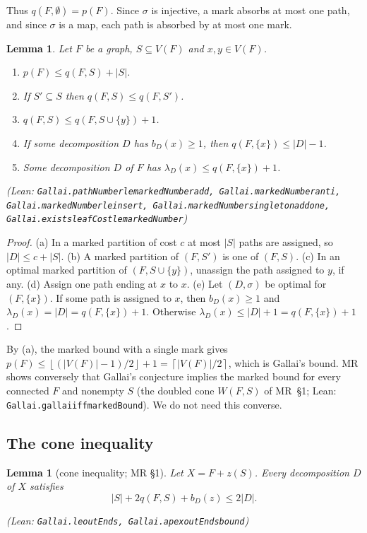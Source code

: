 \documentclass[11pt]{amsart}
\newtheorem{lemma}[theorem]{Lemma}
\theoremstyle{definition}
\theoremstyle{remark}
\renewcommand{\_}{\oldunderscore\allowbreak}
\newcommand{\leanst}[1]{\par{\raggedright\small\textup{(Lean: \texttt{#1})}\par}}
\newcommand{\fl}[1]{\left\lfloor #1\right\rfloor}
\newcommand{\cl}[1]{\left\lceil #1\right\rceil}
\begin{document}
Thus $q(F,\emptyset)=p(F)$. Since $\sigma$ is injective, a mark absorbs at most one path, and since
$\sigma$ is a map, each path is absorbed by at most one mark.

\begin{lemma}\label{lem:marked-basic}
Let $F$ be a graph, $S\subseteq V(F)$ and $x,y\in V(F)$.
\begin{enumerate}[label=\textup{(\alph*)}]
\item $p(F)\le q(F,S)+|S|$.
\item If $S'\subseteq S$ then $q(F,S)\le q(F,S')$.
\item $q(F,S)\le q(F,S\cup\{y\})+1$.
\item If some decomposition $D$ has $b_D(x)\ge1$, then $q(F,\{x\})\le|D|-1$.
\item Some decomposition $D$ of $F$ has $\lambda_D(x)\le q(F,\{x\})+1$.
\end{enumerate}
\leanst{Gallai.pathNumber\_le\_markedNumber\_add, Gallai.markedNumber\_anti,
Gallai.markedNumber\_le\_insert, Gallai.markedNumber\_singleton\_add\_one,
Gallai.exists\_leafCost\_le\_markedNumber}
\end{lemma}

\begin{proof}
(a) In a marked partition of cost $c$ at most $|S|$ paths are assigned, so $|D|\le c+|S|$.
(b) A marked partition of $(F,S')$ is one of $(F,S)$. (c) In an optimal marked partition of
$(F,S\cup\{y\})$, unassign the path assigned to $y$, if any. (d) Assign one path ending at $x$ to
$x$. (e) Let $(D,\sigma)$ be optimal for $(F,\{x\})$. If some path is assigned to $x$, then
$b_D(x)\ge1$ and $\lambda_D(x)=|D|=q(F,\{x\})+1$. Otherwise $\lambda_D(x)\le|D|+1=q(F,\{x\})+1$.
\end{proof}

By (a), the marked bound with a single mark gives $p(F)\le\fl{(|V(F)|-1)/2}+1=\cl{|V(F)|/2}$, which
is Gallai's bound. MR shows conversely that Gallai's conjecture implies the marked bound for every
connected $F$ and nonempty $S$ (the doubled cone $W(F,S)$ of MR~\S1; Lean:
\texttt{Gallai.gallai\_iff\_markedBound}). We do not need this converse.

\subsection{The cone inequality}

\begin{lemma}[cone inequality; MR \S1]\label{lem:cone}
Let $X=F+z(S)$. Every decomposition $D$ of $X$ satisfies
\[
|S|+2q(F,S)+b_D(z)\le 2|D|.
\]
\leanst{Gallai.le\_outEnds, Gallai.apex\_outEnds\_bound}
\end{lemma}
\end{document}
